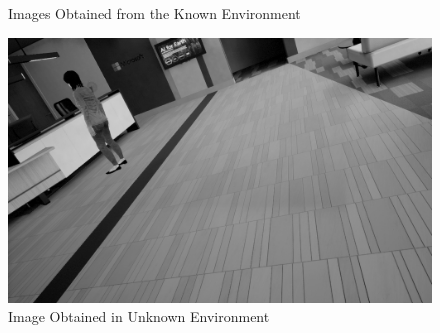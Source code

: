 \begin{figure}[htbp]
\begin{minipage}[h]{0.45\linewidth}
  \end{minipage}
  \caption{Images Obtained from the Known Environment}\label{fig:known_env}
\end{figure}

\begin{figure}[thpb]
\centering
\includegraphics[scale=0.08]{./figure/3_environment/image64.png}
\caption{Image Obtained in Unknown Environment}
\label{fig:unknown_env}
\end{figure}

